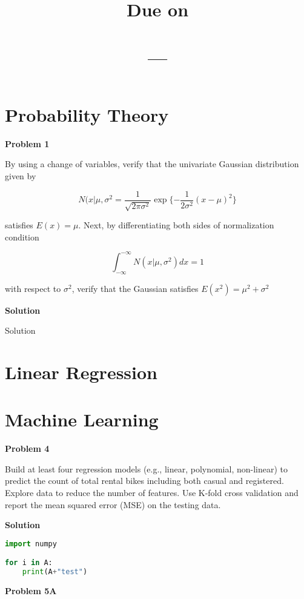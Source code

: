 \documentclass{article}
\title{
    \Title \\
    \vspace{2mm}
    \large
    Due on \DueDate \\
    \ClassName \\ 
    \ClassNumber ---\ClassSection \\
    \Instructor
}
\author{\Author}
\date{}
\newenvironment{problem}[1][]{
    \textbf{Problem #1}\\
    \linebreak
}{
    \vspace{4mm}
}
\newenvironment{solution}{
    \textbf{Solution} \\
    \linebreak
}{
    \vspace{4mm}
}
\begin{document}
\maketitle
\thispagestyle{empty}

\section*{Probability Theory}

\begin{problem}[1]
    By using a change of variables, verify that the univariate Gaussian distribution given by

    \begin{equation}
        N(x|\mu,\sigma^2= \frac{1}{\sqrt{2\pi\sigma^2}} \exp{
            \{
            -\frac{1}{2\sigma^2}
            (x-\mu)^2
            \}
        }
    \end{equation}
    
    satisfies $E(x) = \mu$. Next, by differentiating both sides of normalization condition
    
    \begin{equation}
        \int_{-\infty}^{-\infty} N(x|\mu,\sigma^2) dx = 1
    \end{equation}
    
    with respect to $\sigma^2$, verify that the Gaussian satisfies $E(x^2) = \mu^2+\sigma^2$    
\end{problem}

\begin{solution}
    Solution
\end{solution}

\section*{Linear Regression}


\newpage
\section*{Machine Learning}

\begin{problem}[4]
    Build at least four regression models (e.g., linear, polynomial, non-linear) to predict the count of total rental bikes including both casual and registered. Explore data to reduce the number of features. Use K-fold cross validation and report the mean squared error (MSE) on the testing data.
\end{problem}

\begin{solution}

\begin{lstlisting}[language=Python]
import numpy

for i in A:
    print(A+"test")
\end{lstlisting}

\end{solution}

\hline

\vspace{4mm}

\begin{problem}[5A]

\end{problem}
\end{document}
